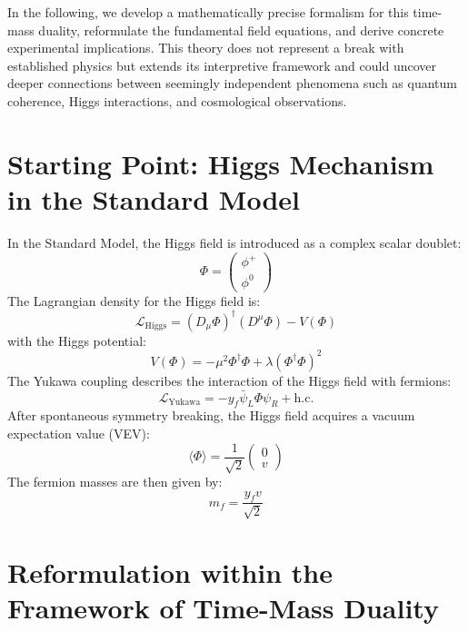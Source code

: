 \documentclass[a4paper,12pt]{article}
\begin{document}
	In the following, we develop a mathematically precise formalism for this time-mass duality, reformulate the fundamental field equations, and derive concrete experimental implications. This theory does not represent a break with established physics but extends its interpretive framework and could uncover deeper connections between seemingly independent phenomena such as quantum coherence, Higgs interactions, and cosmological observations.
	
	\section{Starting Point: Higgs Mechanism in the Standard Model}
	In the Standard Model, the Higgs field is introduced as a complex scalar doublet:
	\begin{equation}
		\Phi = \begin{pmatrix} \phi^+ \\ \phi^0 \end{pmatrix}
	\end{equation}
	The Lagrangian density for the Higgs field is:
	\begin{equation}
		\mathcal{L}_{\text{Higgs}} = (D_\mu \Phi)^\dagger (D^\mu \Phi) - V(\Phi)
	\end{equation}
	with the Higgs potential:
	\begin{equation}
		V(\Phi) = -\mu^2 \Phi^\dagger \Phi + \lambda (\Phi^\dagger \Phi)^2
	\end{equation}
	The Yukawa coupling describes the interaction of the Higgs field with fermions:
	\begin{equation}
		\mathcal{L}_{\text{Yukawa}} = -y_f \bar{\psi}_L \Phi \psi_R + \text{h.c.}
	\end{equation}
	After spontaneous symmetry breaking, the Higgs field acquires a vacuum expectation value (VEV):
	\begin{equation}
		\langle \Phi \rangle = \frac{1}{\sqrt{2}} \begin{pmatrix} 0 \\ v \end{pmatrix}
	\end{equation}
	The fermion masses are then given by:
	\begin{equation}
		m_f = \frac{y_f v}{\sqrt{2}}
	\end{equation}
	
	\section{Reformulation within the Framework of Time-Mass Duality}
\end{document}
